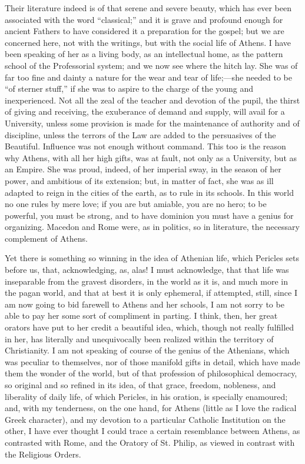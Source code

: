 Their literature indeed is of that serene and severe beauty, which
has ever been associated with the word ``classical;'' and it
is grave and profound enough for ancient Fathers to have considered it
a preparation for the gospel; but we are concerned here, not with the
writings, but with the social life of Athens. I have been speaking of
her as a living body, as an intellectual home, as the pattern school
of the Professorial system; and we now see where the hitch lay. She
was of far too fine and dainty a nature for the wear and tear of life;—she
needed to be ``of sterner stuff,'' if she was to aspire to the
charge of the young and inexperienced. Not all the zeal of the teacher
and devotion of the pupil, the thirst of giving and receiving, the
exuberance of demand and supply, will avail for a University, unless
some provision is made for the maintenance of authority and of
discipline, unless the terrors of the Law are added to the persuasives
of the Beautiful. Influence was not enough without command. This too
is the reason why Athens, with all her high gifts, was at fault, not
only as a University, but as an Empire. She was proud, indeed, of her
imperial sway, in the season of her power, and ambitious of its
extension; but, in matter of fact, she was as ill adapted to reign in
the cities of the earth, as to rule in its schools. In this world no
one rules by mere love; if you are but amiable, you are no hero; to be
powerful, you must be strong, and to have dominion you must have a
genius for organizing. Macedon and Rome were, as in politics, so
in literature, the necessary complement of Athens.

Yet there is something so winning in the idea of Athenian life,
which Pericles sets before us, that, acknowledging, as, alas! I must
acknowledge, that that life was inseparable from the gravest
disorders, in the world as it is, and much more in the pagan world,
and that at best it is only ephemeral, if attempted, still, since I am
now going to bid farewell to Athens and her schools, I am not sorry to
be able to pay her some sort of compliment in parting. I think, then,
her great orators have put to her credit a beautiful idea, which,
though not really fulfilled in her, has literally and unequivocally
been realized within the territory of Christianity. I am not speaking
of course of the genius of the Athenians, which was peculiar to
themselves, nor of those manifold gifts in detail, which have made
them the wonder of the world, but of that profession of philosophical
democracy, so original and so refined in its idea, of that grace,
freedom, nobleness, and liberality of daily life, of which Pericles,
in his oration, is specially enamoured; and, with my tenderness, on
the one hand, for Athens (little as I love the radical Greek
character), and my devotion to a particular Catholic Institution on
the other, I have ever thought I could trace a certain resemblance
between Athens, as contrasted with Rome, and the Oratory of St.
Philip, as viewed in contrast with the Religious Orders.

